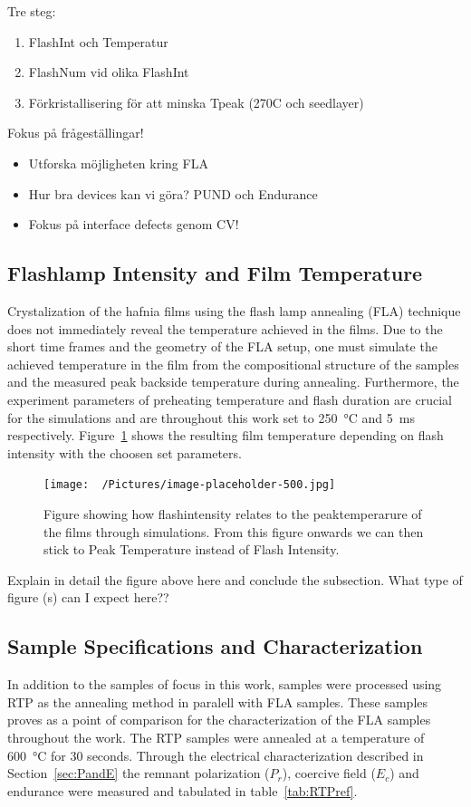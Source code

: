 \documentclass[11pt]{article}
\begin{document}
    Tre steg:
    \begin{enumerate}
        \item FlashInt och Temperatur
        \item FlashNum vid olika FlashInt
        \item Förkristallisering för att minska Tpeak (270C och seedlayer)
    \end{enumerate}

    Fokus på frågeställingar!
    \begin{itemize}
        \item Utforska möjligheten kring FLA
        \item Hur bra devices kan vi göra? PUND och Endurance
        \item Fokus på interface defects genom CV!\  
    \end{itemize}
    \fi

    \subsection{Flashlamp Intensity and Film Temperature}
    Crystalization of the hafnia films using the flash lamp annealing (FLA) technique does not immediately reveal the temperature achieved in the films. Due to the short time frames and the geometry of the FLA setup, one must simulate the achieved temperature in the film from the compositional structure of the samples and the measured peak backside temperature during annealing. Furthermore, the experiment parameters of preheating temperature and flash duration are crucial for the simulations and are throughout this work set to \SI{250}{\celsius} and \SI{5}{\milli\second} respectively. Figure~\ref{fig:res_ComsolSim} shows the resulting film temperature depending on flash intensity with the choosen set parameters.
    
    \begin{figure}[ht!]
        \centering
        \texttt{[image: ~/Pictures/image-placeholder-500.jpg]}
        \caption{Figure showing how flashintensity relates to the peaktemperarure of the films through simulations. From this figure onwards we can then stick to Peak Temperature instead of Flash Intensity.}\label{fig:res_ComsolSim}
    \end{figure}

    Explain in detail the figure above here and conclude the subsection. What type of figure (s) can I expect here??

    \subsection{Sample Specifications and Characterization}
    In addition to the samples of focus in this work, samples were processed using RTP as the annealing method in paralell with FLA samples. These samples proves as a point of comparison for the characterization of the FLA samples throughout the work. The RTP samples were annealed at a temperature of \SI{600}{\celsius} for 30 seconds. Through the electrical characterization described in Section~\ref{sec:PandE} the remnant polarization ($P_r$), coercive field ($E_c$) and endurance were measured and tabulated in table~\ref{tab:RTPref}.
\end{document}
